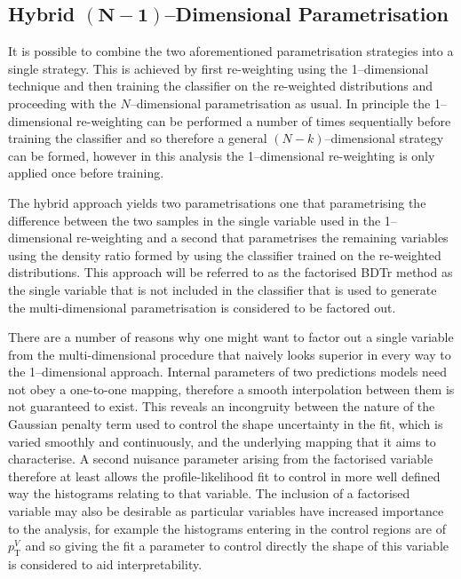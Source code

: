 \subsection{Hybrid $\mathbf{(N - 1)}$--Dimensional Parametrisation}
\label{sec:hybrid-reweight}

It is possible to combine the two aforementioned parametrisation strategies into
a single strategy. This is achieved by first re-weighting using the
1--dimensional technique and then training the classifier on the re-weighted
distributions and proceeding with the $N$--dimensional parametrisation as usual.
In principle the 1--dimensional re-weighting can be performed a number of times
sequentially before training the classifier and so therefore a general
$(N-k)$--dimensional strategy can be formed, however in this analysis the
1--dimensional re-weighting is only applied once before training.

The hybrid approach yields two parametrisations one that parametrising the
difference between the two samples in the single variable used in the
1--dimensional re-weighting and a second that parametrises the remaining
variables using the density ratio formed by using the classifier trained on the
re-weighted distributions. This approach will be referred to as the factorised
BDTr method as the single variable that is not included in the classifier that
is used to generate the multi-dimensional parametrisation is considered to be
factored out.

There are a number of reasons why one might want to factor out a single variable
from the multi-dimensional procedure that naively looks superior in every way to
the 1--dimensional approach. Internal parameters of two predictions models need
not obey a one-to-one mapping, therefore a smooth interpolation between them is
not guaranteed to exist. This reveals an incongruity between the nature of the
Gaussian penalty term used to control the shape uncertainty in the fit, which is
varied smoothly and continuously, and the underlying mapping that it aims to
characterise.  A second nuisance parameter arising from the factorised variable
therefore at least allows the profile-likelihood fit to control in more
well defined way the histograms relating to that variable. The inclusion of a
factorised variable may also be desirable as particular variables have increased
importance to the analysis, for example the histograms entering in the control
regions are of $p_{\mathrm{T}}^V$ and so giving the fit a parameter to control
directly the shape of this variable is considered to aid interpretability.

